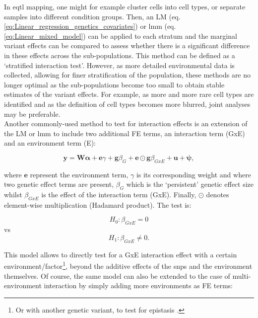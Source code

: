 In \gls{eqtl} mapping, one might for example cluster cells into cell types, or separate samples into different condition groups.
Then, an LM (eq. \eqref{eq:Linear_regression_genetics_covariates}) or \gls{lmm} (eq. \eqref{eq:Linear_mixed_model}) can be applied to each stratum and the marginal variant effects can be compared to assess whether there is a significant difference in these effects across the sub-populations.
This method can be defined as a `stratified interaction test'.
However, as more detailed environmental data is collected, allowing for finer stratification of the population, these methods are no longer optimal as the sub-populations become too small to obtain stable estimates of the variant effects.
For example, as more and more rare cell types are identified and as the definition of cell types becomes more blurred, joint analyses may be preferable. \\



Another commonly-used method to test for interaction effects is an extension of the LM or \gls{lmm} to include two additional FE terms, an interaction term (GxE) and an environment term (E):

\begin{equation}\label{eq:Interaction_test_FE_LMM}
 \mathbf{y} =  \mathbf{W}\boldsymbol{\alpha} + \mathbf{e}\gamma  + \mathbf{g}\beta_G + \mathbf{e}\odot\mathbf{g}\beta_{GxE} + \mathbf{u} + \boldsymbol{\psi}, 
\end{equation}

where $\mathbf{e}$ represent the environment term, $\gamma$ is its corresponding weight and where two genetic effect terms are present, $\beta_G$ which is the `persistent' genetic effect size whilst $\beta_{GxE}$ is the effect of the interaction term (GxE).
Finally, $\odot$ denotes element-wise multiplication (Hadamard product).
The test is:

\begin{equation}
 H_{0}: \beta_{GxE}=0 
\end{equation}
vs
\begin{equation}
 H_{1}: \beta_{GxE} \neq 0. 
\end{equation}

This model allows to directly test for a GxE interaction effect with a certain environment/factor\footnote{Or with another genetic variant, to test for epistasis \cite{wei2014detecting}.}, beyond the additive effects of the \gls{snp}s and the environment themselves. 
Of course, the same model can also be extended to the case of multi-environment interaction by simply adding more environments as FE terms:

